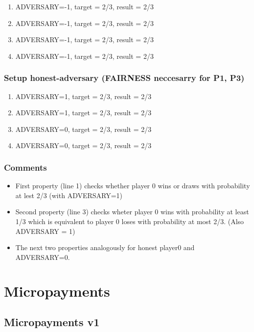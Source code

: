 \documentclass{article}
\begin{document}
\begin{enumerate}
\item ADVERSARY=-1, target = 2/3, result = 2/3
\item ADVERSARY=-1, target = 2/3, result = 2/3
\item ADVERSARY=-1, target = 2/3, result = 2/3
\item ADVERSARY=-1, target = 2/3, result = 2/3
\end{enumerate}

\subsubsection{Setup honest-adversary (FAIRNESS neccesarry for P1, P3)}

\begin{enumerate}
\item ADVERSARY=1, target = 2/3, result = 2/3
\item ADVERSARY=1, target = 2/3, result = 2/3
\item ADVERSARY=0, target = 2/3, result = 2/3
\item ADVERSARY=0, target = 2/3, result = 2/3
\end{enumerate}

\subsubsection{Comments}

\begin{itemize}
\item First property (line 1) checks whether player 0 wins or draws with probability at lest 2/3 (with ADVERSARY=1)
\item Second property (line 3) checks wheter player 0 wins with probability at least 1/3 which is equivalent to player 0
loses with probability at most 2/3. (Also ADVERSARY = 1)
\item The next two properties analogously for honest player0 and ADVERSARY=0.
\end{itemize}


\section{Micropayments}

\subsection{Micropayments v1}
\end{document}

